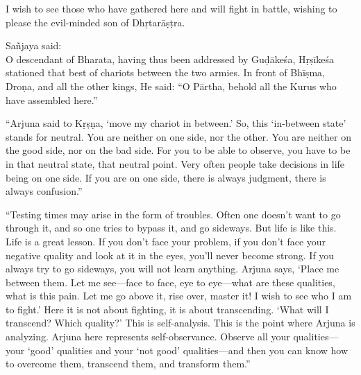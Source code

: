 {I wish to see those who have gathered here and will fight in battle, wishing to please the evil-minded son of Dhṛtarāṣṭra.}

{\hspace*{1em}Sañjaya said: \\
O descendant of Bharata, having thus been addressed by Guḍākeśa, Hṛṣīkeśa stationed that best of chariots between the two armies. In front of Bhīṣma, Droṇa, and all the other kings, He said: \enquote{O Pārtha, behold all the Kurus who have assembled here.}}

\enquote{Arjuna said to Kṛṣṇa, \enquote{move my chariot in between.} So, this \enquote{in-between state} stands for neutral. You are neither on one side, nor the other. You are neither on the good side, nor on the bad side. For you to be able to observe, you have to be in that neutral state, that neutral point. Very often people take decisions in life being on one side. If you are on one side, there is always judgment, there is always confusion.}

\enquote{Testing times may arise in the form of troubles. Often one doesn’t want to go through it, and so one tries to bypass it, and go sideways. But life is like this. Life is a great lesson. If you don’t face your problem, if you don’t face your negative quality and look at it in the eyes, you’ll never become strong. If you always try to go sideways, you will not learn anything. Arjuna says, \enquote{Place me between them. Let me see---face to face, eye to eye---what are these qualities, what is this pain. Let me go above it, rise over, master it! I wish to see who I am to fight.} Here it is not about fighting, it is about transcending. \enquote{What will I transcend? Which quality?} This is self-analysis. This is the point where Arjuna is analyzing. Arjuna here represents self-observance. Observe all your qualities---your \enquote{good} qualities and your \enquote{not good} qualities---and then you can know how to overcome them, transcend them, and transform them.}

